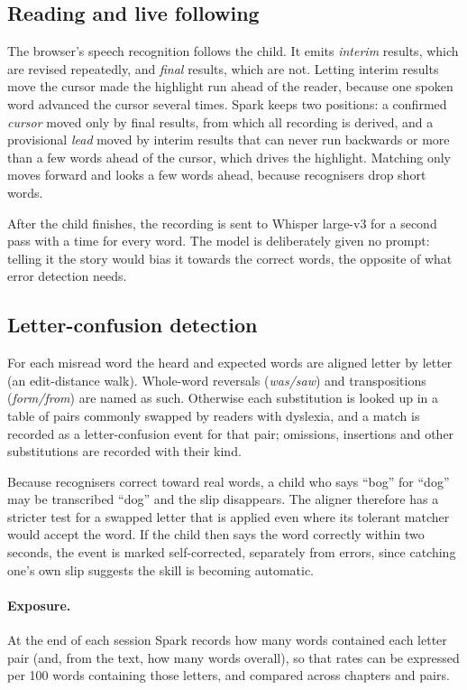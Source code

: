 \documentclass[manuscript, screen, review, anonymous]{acmart}
\begin{document}
\subsection{Reading and live following}
The browser's speech recognition follows the child. It emits \emph{interim} results, which are revised repeatedly, and \emph{final} results, which are not. Letting interim results move the cursor made the highlight run ahead of the reader, because one spoken word advanced the cursor several times. Spark keeps two positions: a confirmed \emph{cursor} moved only by final results, from which all recording is derived, and a provisional \emph{lead} moved by interim results that can never run backwards or more than a few words ahead of the cursor, which drives the highlight. Matching only moves forward and looks a few words ahead, because recognisers drop short words.

After the child finishes, the recording is sent to Whisper large-v3 \cite{radford2023whisper} for a second pass with a time for every word. The model is deliberately given no prompt: telling it the story would bias it towards the correct words, the opposite of what error detection needs.

\subsection{Letter-confusion detection}
\label{sec:confusion}
For each misread word the heard and expected words are aligned letter by letter (an edit-distance walk). Whole-word reversals (\emph{was/saw}) and transpositions (\emph{form/from}) are named as such. Otherwise each substitution is looked up in a table of pairs commonly swapped by readers with dyslexia, and a match is recorded as a letter-confusion event for that pair; omissions, insertions and other substitutions are recorded with their kind.

Because recognisers correct toward real words, a child who says ``bog'' for ``dog'' may be transcribed ``dog'' and the slip disappears. The aligner therefore has a stricter test for a swapped letter that is applied even where its tolerant matcher would accept the word. If the child then says the word correctly within two seconds, the event is marked self-corrected, separately from errors, since catching one's own slip suggests the skill is becoming automatic.

\paragraph{Exposure.} At the end of each session Spark records how many words contained each letter pair (and, from the text, how many words overall), so that rates can be expressed per 100 words containing those letters, and compared across chapters and pairs.
\end{document}
